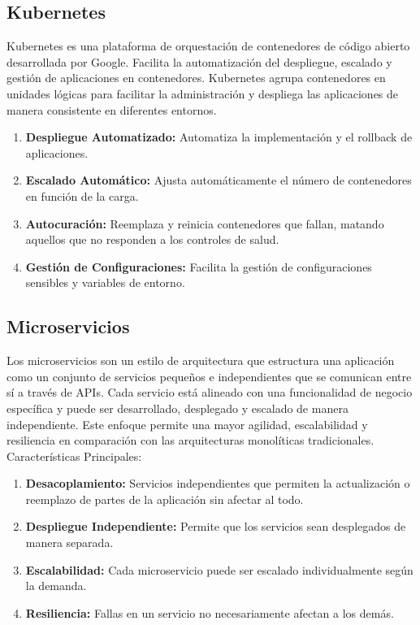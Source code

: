 \documentclass{article}
\begin{document}
\subsection{Kubernetes}
Kubernetes es una plataforma de orquestación de contenedores de código abierto desarrollada por Google. Facilita la automatización del despliegue, escalado y gestión de aplicaciones en contenedores. Kubernetes agrupa contenedores en unidades lógicas para facilitar la administración y despliega las aplicaciones de manera consistente en diferentes entornos.
\begin{enumerate}
    \item \textbf{Despliegue Automatizado:} Automatiza la implementación y el rollback de aplicaciones.
    \item \textbf{Escalado Automático:} Ajusta automáticamente el número de contenedores en función de la carga.
    \item \textbf{Autocuración:} Reemplaza y reinicia contenedores que fallan, matando aquellos que no responden a los controles de salud.
    \item \textbf{Gestión de Configuraciones:} Facilita la gestión de configuraciones sensibles y variables de entorno.
\end{enumerate}

\subsection{Microservicios}
Los microservicios son un estilo de arquitectura que estructura una aplicación como un conjunto de servicios pequeños e independientes que se comunican entre sí a través de APIs. Cada servicio está alineado con una funcionalidad de negocio específica y puede ser desarrollado, desplegado y escalado de manera independiente. Este enfoque permite una mayor agilidad, escalabilidad y resiliencia en comparación con las arquitecturas monolíticas tradicionales.\\

Características Principales:
\begin{enumerate}
    \item \textbf{Desacoplamiento:} Servicios independientes que permiten la actualización o reemplazo de partes de la aplicación sin afectar al todo.
    \item \textbf{Despliegue Independiente:} Permite que los servicios sean desplegados de manera separada.
    \item \textbf{Escalabilidad:} Cada microservicio puede ser escalado individualmente según la demanda.
    \item \textbf{Resiliencia:} Fallas en un servicio no necesariamente afectan a los demás.
\end{enumerate}
\end{document}
